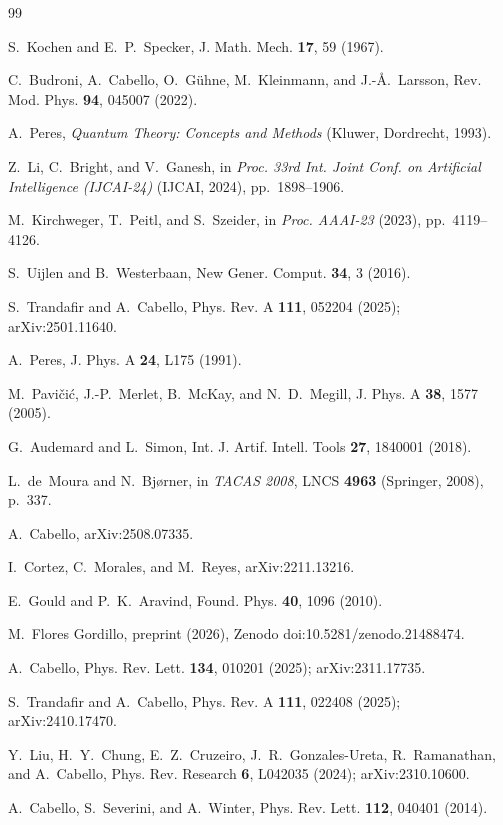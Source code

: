 \documentclass[twocolumn,prl,superscriptaddress,nofootinbib]{revtex4-2}
\begin{document}
\begin{thebibliography}{99}

S.~Kochen and E.~P.~Specker, J. Math. Mech. \textbf{17}, 59 (1967).

C.~Budroni, A.~Cabello, O.~G\"uhne, M.~Kleinmann, and J.-{\AA}.~Larsson,
Rev. Mod. Phys. \textbf{94}, 045007 (2022).

A.~Peres, \textit{Quantum Theory: Concepts and Methods}
(Kluwer, Dordrecht, 1993).

Z.~Li, C.~Bright, and V.~Ganesh, in \textit{Proc. 33rd Int. Joint Conf. on
Artificial Intelligence (IJCAI-24)} (IJCAI, 2024), pp.~1898--1906.

M.~Kirchweger, T.~Peitl, and S.~Szeider, in \textit{Proc. AAAI-23} (2023),
pp.~4119--4126.

S.~Uijlen and B.~Westerbaan, New Gener. Comput. \textbf{34}, 3 (2016).

S.~Trandafir and A.~Cabello, Phys. Rev. A \textbf{111}, 052204 (2025);
arXiv:2501.11640.

A.~Peres, J. Phys. A \textbf{24}, L175 (1991).

M.~Pavi\v{c}i\'c, J.-P.~Merlet, B.~McKay, and N.~D.~Megill,
J. Phys. A \textbf{38}, 1577 (2005).

G.~Audemard and L.~Simon, Int. J. Artif. Intell. Tools \textbf{27}, 1840001 (2018).

L.~de~Moura and N.~Bj{\o}rner, in \textit{TACAS 2008}, LNCS \textbf{4963}
(Springer, 2008), p.~337.

A.~Cabello, arXiv:2508.07335.

I.~Cortez, C.~Morales, and M.~Reyes, arXiv:2211.13216.

E.~Gould and P.~K.~Aravind, Found. Phys. \textbf{40}, 1096 (2010).

M.~Flores Gordillo, preprint (2026), Zenodo doi:10.5281/zenodo.21488474.

A.~Cabello, Phys. Rev. Lett. \textbf{134}, 010201 (2025); arXiv:2311.17735.

S.~Trandafir and A.~Cabello, Phys. Rev. A \textbf{111}, 022408 (2025);
arXiv:2410.17470.

Y.~Liu, H.~Y.~Chung, E.~Z.~Cruzeiro, J.~R.~Gonzales-Ureta, R.~Ramanathan, and
A.~Cabello, Phys. Rev. Research \textbf{6}, L042035 (2024); arXiv:2310.10600.

A.~Cabello, S.~Severini, and A.~Winter, Phys. Rev. Lett. \textbf{112}, 040401 (2014).

\end{thebibliography}
\end{document}
